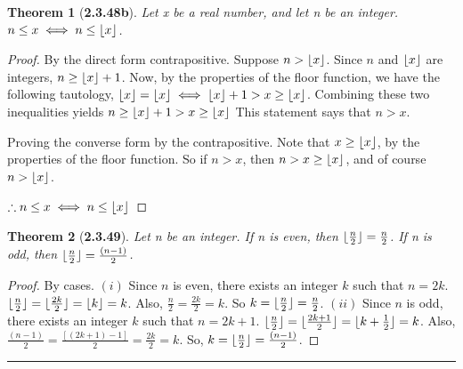 \documentclass[a4paper, 12pt]{article}
\theoremstyle{plain}
\newtheorem*{theorem*}{Theorem}
\DeclarePairedDelimiter{\floor}{\lfloor}{\rfloor}
\begin{document}
\begin{theorem*}[\textbf{2.3.48b}]
    Let x be a real number, and let n be an integer. \newline $n \le x \iff n \le \floor{x}$.
\end{theorem*}

\begin{proof}
    By the direct form contrapositive. Suppose $n > \floor{x}$. Since $n$ and $\floor{x}$ are 
    integers, $n \ge \floor{x} + 1$. Now, by the properties of the floor function, we have the 
    following tautology, $\floor{x} = \floor{x} \iff \floor{x} + 1 > x \ge \floor{x}$. 
    Combining these two inequalities yields $n \ge \floor{x} + 1 > x \ge \floor{x}$ This 
    statement says that $n > x$.
    
    Proving the converse form by the contrapositive. Note that $x \ge \floor{x}$, by the 
    properties of the floor function. So if $n > x$, then $n > x \ge \floor{x}$, and of course 
    $n > \floor{x}$.
    
    $\therefore n \le x \iff n \le \floor{x}$
\end{proof}

\pagebreak


\begin{theorem*}[\textbf{2.3.49}]
    Let n be an integer. If n is even, then $\floor{\frac{n}{2}} = \frac{n}{2}$. \newline If 
    n is odd, then $\floor{\frac{n}{2}} = \frac{(n - 1)}{2}$.
\end{theorem*}

\begin{proof}
    By cases. \newline \newline $(i)$ Since $n$ is even,  there exists an integer $k$ such 
    that $n = 2k$. \newline $\floor{\frac{n}{2}} = \floor{\frac{2k}{2}} = \floor{k} = k$. 
    Also, $\frac{n}{2} = \frac{2k}{2} = k$. So $k = \floor{\frac{n}{2}} = \frac{n}{2}$.
    \newline
    \newline
    $(ii)$ Since $n$ is odd, there exists an integer $k$ such that $n = 2k + 1$. \newline 
    $\floor{\frac{n}{2}} = \floor{\frac{2k + 1}{2}} = \floor{k + \frac{1}{2}} = k$. Also, 
    $\frac{(n-1)}{2} = \frac{[(2k + 1) - 1]}{2} = \frac{2k}{2} = k$. \newline So, 
    $k = \floor{\frac{n}{2}} = \frac{(n - 1)}{2}$.
\end{proof}
\begin{center}
    \rule{5.4in}{1pt}
\end{center}
\end{document}
